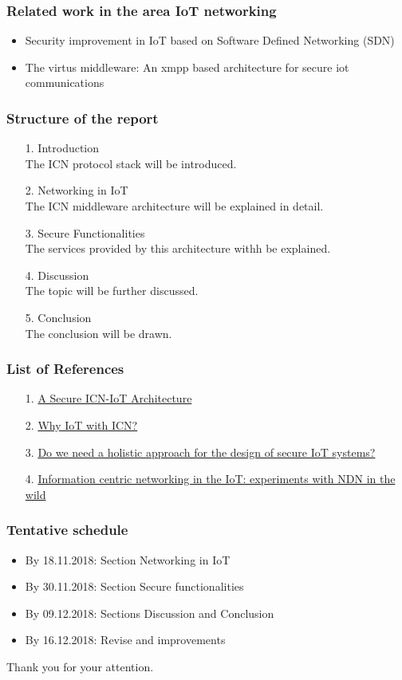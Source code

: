 \documentclass{beamer}
\begin{document}
\begin{frame}
\frametitle{Related work in the area IoT networking}
\begin{itemize}
	\item Security improvement in IoT based on Software
	Defined Networking (SDN)


	\item The virtus middleware: An xmpp based architecture for secure iot communications
\end{itemize}

\end{frame}
\begin{frame}
\frametitle{Structure of the report}
\begin{itemize}
	\item[1.]Introduction \\
	The ICN protocol stack will be introduced.
	\item[2.]Networking in IoT \\
	The ICN middleware architecture will be explained in detail.
	\item[3.]Secure Functionalities\\
	The services provided by this architecture withh be explained.
	\item[4.]Discussion\\
	The topic will be further discussed.
	\item[5.]Conclusion\\
	The conclusion will be drawn.
\end{itemize}
\end{frame}
\begin{frame}
\frametitle{List of References}
\begin{itemize}
	\item[1.]\href {https://ieeexplore.ieee.org/document/7962667}{A Secure ICN-IoT Architecture} 
	\item[2.]\href {http://conferences2.sigcomm.org/acm-icn/2017/files/tutorial-ndn-ccnlite-riot/2-Why-ICN-for-IoT.pdf}{Why IoT with ICN?}
	\item[3.]\href{http://delivery.acm.org/10.1145/3080000/3079070/p425-Conti.pdf}{Do we need a holistic approach for the design of secure IoT
		systems?}
	\item[4.] \href {http:delivery.acm.org/10.1145/2670000/2660144/p77-baccelli.pdf?}{Information centric networking in the IoT: experiments with NDN in the wild}
\end{itemize}
	
\end{frame}
\begin{frame}
\frametitle{Tentative schedule}
\begin{itemize}
	\item By 18.11.2018: Section Networking in IoT
	\item By 30.11.2018: Section Secure functionalities 
	\item By 09.12.2018: Sections Discussion and Conclusion
	\item By 16.12.2018: Revise and improvements
\end{itemize}
\end{frame}
\begin{frame}
Thank you for your attention.
\end{frame}
\end{document}
